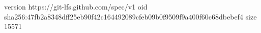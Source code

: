 version https://git-lfs.github.com/spec/v1
oid sha256:47fb2a8348dff25eb90f42c164492089cfeb09b0f9509f9a400f60c68dbebef4
size 15571
